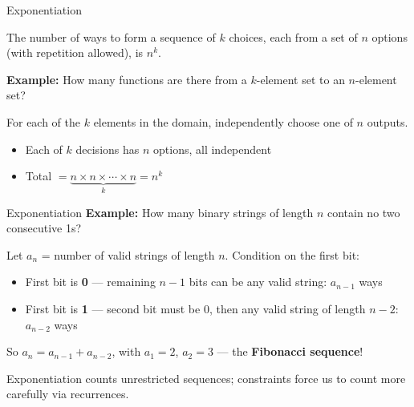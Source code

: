 \begin{frame}{Exponentiation}
  \begin{sqt:definition}
    The number of ways to form a sequence of $k$ choices, each from a set of $n$ options
    (with repetition allowed), is $n^k$.
  \end{sqt:definition}

  \textcolor{sqt-question}{
    \textbf{Example:} How many functions are there from a $k$-element set to an $n$-element set?
  }

  \pause

  For each of the $k$ elements in the domain, independently choose one of $n$ outputs.
  \begin{itemize}
    \item Each of $k$ decisions has $n$ options, all independent
    \item Total $= \underbrace{n \times n \times \cdots \times n}_{k} = n^k$
  \end{itemize}
\end{frame}

\begin{frame}{Exponentiation}
  \textcolor{sqt-question}{
    \textbf{Example:} How many binary strings of length $n$ contain no two consecutive 1s?
  }

  \pause

  Let $a_n$ = number of valid strings of length $n$. Condition on the first bit:
  \begin{itemize}
    \item First bit is \textbf{0} — remaining $n-1$ bits can be any valid string: $a_{n-1}$ ways
    \item First bit is \textbf{1} — second bit must be 0, then any valid string of length $n-2$: $a_{n-2}$ ways
  \end{itemize}
  So $a_n = a_{n-1} + a_{n-2}$, with $a_1 = 2$, $a_2 = 3$ — the \textbf{Fibonacci sequence}!

  \begin{sqt:tip}
    Exponentiation counts unrestricted sequences; constraints force us to count more carefully via recurrences.
  \end{sqt:tip}
\end{frame}

